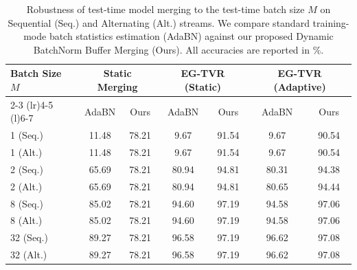 \documentclass{article}
\theoremstyle{plain}
\theoremstyle{definition}
\theoremstyle{remark}
\begin{document}
\begin{table}[t]
\caption{Robustness of test-time model merging to the test-time batch size $M$ on Sequential (Seq.) and Alternating (Alt.) streams. We compare standard training-mode batch statistics estimation (AdaBN) against our proposed Dynamic BatchNorm Buffer Merging (Ours). All accuracies are reported in \%.}
\label{tab:batch_size}
\vskip 0.05in
\begin{center}
\begin{scriptsize}
\begin{sc}
\setlength{\tabcolsep}{0.3pt}
\begin{tabular}{lcccccc}
\toprule
Batch Size $M$ & \multicolumn{2}{c}{Static Merging} & \multicolumn{2}{c}{EG-TVR (Static)} & \multicolumn{2}{c}{EG-TVR (Adaptive)} \\
\cmidrule(r){2-3} \cmidrule(lr){4-5} \cmidrule(l){6-7}
& AdaBN & Ours & AdaBN & Ours & AdaBN & Ours \\
\midrule
1 (Seq.) & 11.48 & 78.21 & 9.67 & 91.54 & 9.67 & 90.54 \\
1 (Alt.) & 11.48 & 78.21 & 9.67 & 91.54 & 9.67 & 90.54 \\
\midrule
2 (Seq.) & 65.69 & 78.21 & 80.94 & 94.81 & 80.31 & 94.38 \\
2 (Alt.) & 65.69 & 78.21 & 80.94 & 94.81 & 80.65 & 94.44 \\
\midrule
8 (Seq.) & 85.02 & 78.21 & 94.60 & 97.19 & 94.58 & 97.06 \\
8 (Alt.) & 85.02 & 78.21 & 94.60 & 97.19 & 94.58 & 97.06 \\
\midrule
32 (Seq.) & 89.27 & 78.21 & 96.58 & 97.19 & 96.62 & 97.08 \\
32 (Alt.) & 89.27 & 78.21 & 96.58 & 97.19 & 96.62 & 97.08 \\
\bottomrule
\end{tabular}
\end{sc}
\end{scriptsize}
\end{center}
\vskip -0.1in
\end{table}
\end{document}
